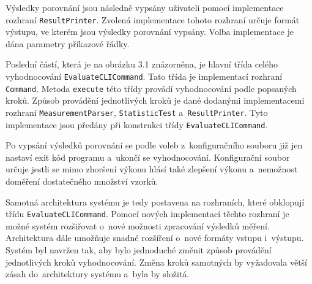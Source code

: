 Výsledky porovnání jsou následně vypsány uživateli pomocí implementace rozhraní \lstinline|ResultPrinter|.
Zvolená implementace tohoto rozhraní určuje formát výstupu, ve kterém jsou výsledky porovnání vypsány.
Volba implementace je dána parametry příkazové řádky.

Poslední částí, která je na obrázku 3.1 znázorněna, je hlavní třída celého vyhodnocování \lstinline|EvaluateCLICommand|.
Tato třída je implementací rozhraní \lstinline|Command|. Metoda \lstinline|execute| této třídy
provádí vyhodnocování podle popsaných kroků. Způsob provádění jednotlivých kroků je dané
dodanými implementacemi rozhraní \lstinline|MeasurementParser|, \lstinline|StatisticTest| a~\lstinline|ResultPrinter|.
Tyto implementace jsou předány při konstrukci třídy \lstinline|EvaluateCLICommand|.

Po vypsání výsledků porovnání se podle voleb z~konfiguračního souboru již jen nastaví exit kód programu a~ukončí se vyhodnocování.
Konfigurační soubor určuje jestli se mimo zhoršení výkonu hlásí také zlepšení výkonu a~nemožnost doměření dostatečného množství vzorků.

Samotná architektura systému je tedy postavena na rozhraních, které obklopují třídu \lstinline|EvaluateCLICommand|.
Pomocí nových implementací těchto rozhraní je možné systém rozšiřovat o~nové možnosti zpracování výsledků měření.
Architektura dále umožňuje snadné rozšíření o~nové formáty vstupu i~výstupu. Systém byl navržen tak, aby bylo
jednoduché změnit způsob provádění jednotlivých kroků vyhodnocování. Změna kroků samotných by vyžadovala
větší zásah do~architektury systému a~byla by složitá.


